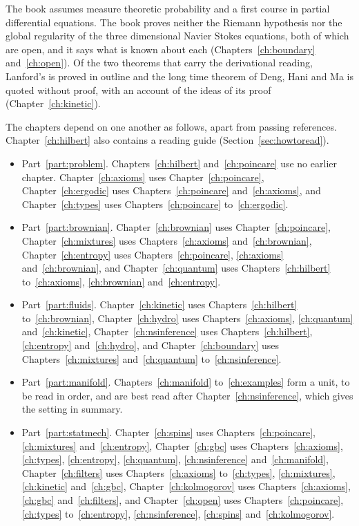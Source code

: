 The book assumes measure theoretic probability and a first course in partial differential equations. The book proves neither the Riemann hypothesis nor the global regularity of the three dimensional Navier Stokes equations, both of which are open, and it says what is known about each (Chapters~\ref{ch:boundary} and~\ref{ch:open}). Of the two theorems that carry the derivational reading, Lanford's is proved in outline and the long time theorem of Deng, Hani and Ma is quoted without proof, with an account of the ideas of its proof (Chapter~\ref{ch:kinetic}).

The chapters depend on one another as follows, apart from passing references. Chapter~\ref{ch:hilbert} also contains a reading guide (Section~\ref{sec:howtoread}).
\begin{itemize}
\item Part~\ref{part:problem}. Chapters~\ref{ch:hilbert} and~\ref{ch:poincare} use no earlier chapter. Chapter~\ref{ch:axioms} uses Chapter~\ref{ch:poincare}, Chapter~\ref{ch:ergodic} uses Chapters~\ref{ch:poincare} and~\ref{ch:axioms}, and Chapter~\ref{ch:types} uses Chapters~\ref{ch:poincare} to~\ref{ch:ergodic}.
\item Part~\ref{part:brownian}. Chapter~\ref{ch:brownian} uses Chapter~\ref{ch:poincare}, Chapter~\ref{ch:mixtures} uses Chapters~\ref{ch:axioms} and~\ref{ch:brownian}, Chapter~\ref{ch:entropy} uses Chapters~\ref{ch:poincare}, \ref{ch:axioms} and~\ref{ch:brownian}, and Chapter~\ref{ch:quantum} uses Chapters~\ref{ch:hilbert} to~\ref{ch:axioms}, \ref{ch:brownian} and~\ref{ch:entropy}.
\item Part~\ref{part:fluids}. Chapter~\ref{ch:kinetic} uses Chapters~\ref{ch:hilbert} to~\ref{ch:brownian}, Chapter~\ref{ch:hydro} uses Chapters~\ref{ch:axioms}, \ref{ch:quantum} and~\ref{ch:kinetic}, Chapter~\ref{ch:nsinference} uses Chapters~\ref{ch:hilbert}, \ref{ch:entropy} and~\ref{ch:hydro}, and Chapter~\ref{ch:boundary} uses Chapters~\ref{ch:mixtures} and~\ref{ch:quantum} to~\ref{ch:nsinference}.
\item Part~\ref{part:manifold}. Chapters~\ref{ch:manifold} to~\ref{ch:examples} form a unit, to be read in order, and are best read after Chapter~\ref{ch:nsinference}, which gives the setting in summary.
\item Part~\ref{part:statmech}. Chapter~\ref{ch:spins} uses Chapters~\ref{ch:poincare}, \ref{ch:mixtures} and~\ref{ch:entropy}, Chapter~\ref{ch:gbc} uses Chapters~\ref{ch:axioms}, \ref{ch:types}, \ref{ch:entropy}, \ref{ch:quantum}, \ref{ch:nsinference} and~\ref{ch:manifold}, Chapter~\ref{ch:filters} uses Chapters~\ref{ch:axioms} to~\ref{ch:types}, \ref{ch:mixtures}, \ref{ch:kinetic} and~\ref{ch:gbc}, Chapter~\ref{ch:kolmogorov} uses Chapters~\ref{ch:axioms}, \ref{ch:gbc} and~\ref{ch:filters}, and Chapter~\ref{ch:open} uses Chapters~\ref{ch:poincare}, \ref{ch:types} to~\ref{ch:entropy}, \ref{ch:nsinference}, \ref{ch:spins} and~\ref{ch:kolmogorov}.
\end{itemize}

